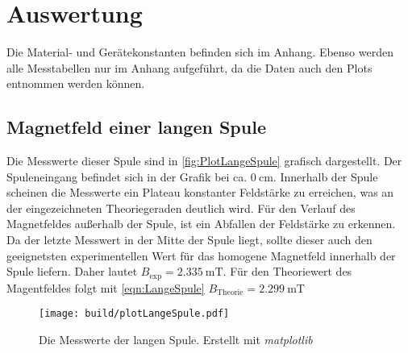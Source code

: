 \section{Auswertung}
\label{sec:Auswertung}
Die Material- und Gerätekonstanten befinden sich im Anhang. Ebenso werden alle Messtabellen nur im Anhang aufgeführt, da die Daten auch den Plots entnommen werden können.
\subsection{Magnetfeld einer langen Spule}
\label{subsec:A_langeSpule}
Die Messwerte dieser Spule sind in \autoref{fig:PlotLangeSpule} grafisch dargestellt. Der Spuleneingang befindet sich in der Grafik bei ca. $0 \: \unit{\centi\metre}$.
Innerhalb der Spule scheinen die Messwerte ein Plateau konstanter Feldstärke zu erreichen, was an der eingezeichneten Theoriegeraden deutlich wird. 
Für den Verlauf des Magnetfeldes außerhalb der Spule, ist ein Abfallen der Feldstärke zu erkennen. Da der letzte Messwert in der Mitte der Spule liegt, sollte dieser auch den geeignetsten experimentellen Wert
für das homogene Magnetfeld innerhalb der Spule liefern. Daher lautet $B_{\text{exp}} = 2.335\:\unit{\milli\tesla}$. 
Für den Theoriewert des Magentfeldes folgt mit \autoref{eqn:LangeSpule} $B_{\text{Theorie}} = 2.299\:\unit{\milli\tesla}$
\begin{figure}
    \centering
    \caption{Die Messwerte der langen Spule. Erstellt mit \textit{matplotlib} \cite{matplotlib}}
    \label{fig:PlotLangeSpule}
    \texttt{[image: build/plotLangeSpule.pdf]}
\end{figure}
